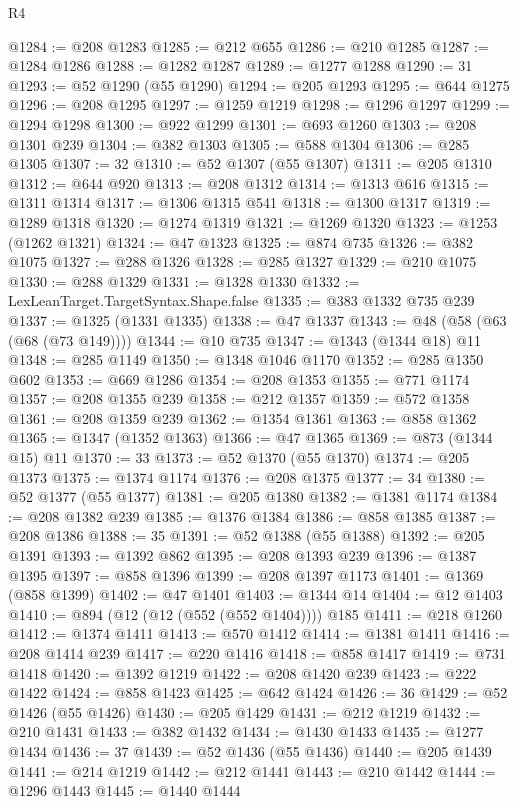 \begin{lexlean}{R4}
\begin{coremodule}
@1284 := @208 @1283
@1285 := @212 @655
@1286 := @210 @1285
@1287 := @1284 @1286
@1288 := @1282 @1287
@1289 := @1277 @1288
@1290 := 31
@1293 := @52 @1290 (@55 @1290)
@1294 := @205 @1293
@1295 := @644 @1275
@1296 := @208 @1295
@1297 := @1259 @1219
@1298 := @1296 @1297
@1299 := @1294 @1298
@1300 := @922 @1299
@1301 := @693 @1260
@1303 := @208 @1301 @239
@1304 := @382 @1303
@1305 := @588 @1304
@1306 := @285 @1305
@1307 := 32
@1310 := @52 @1307 (@55 @1307)
@1311 := @205 @1310
@1312 := @644 @920
@1313 := @208 @1312
@1314 := @1313 @616
@1315 := @1311 @1314
@1317 := @1306 @1315 @541
@1318 := @1300 @1317
@1319 := @1289 @1318
@1320 := @1274 @1319
@1321 := @1269 @1320
@1323 := @1253 (@1262 @1321)
@1324 := @47 @1323
@1325 := @874 @735
@1326 := @382 @1075
@1327 := @288 @1326
@1328 := @285 @1327
@1329 := @210 @1075
@1330 := @288 @1329
@1331 := @1328 @1330
@1332 := LexLeanTarget.TargetSyntax.Shape.false
@1335 := @383 @1332 @735 @239
@1337 := @1325 (@1331 @1335)
@1338 := @47 @1337
@1343 := @48 (@58 (@63 (@68 (@73 @149))))
@1344 := @10 @735
@1347 := @1343 (@1344 @18) @11
@1348 := @285 @1149
@1350 := @1348 @1046 @1170
@1352 := @285 @1350 @602
@1353 := @669 @1286
@1354 := @208 @1353
@1355 := @771 @1174
@1357 := @208 @1355 @239
@1358 := @212 @1357
@1359 := @572 @1358
@1361 := @208 @1359 @239
@1362 := @1354 @1361
@1363 := @858 @1362
@1365 := @1347 (@1352 @1363)
@1366 := @47 @1365
@1369 := @873 (@1344 @15) @11
@1370 := 33
@1373 := @52 @1370 (@55 @1370)
@1374 := @205 @1373
@1375 := @1374 @1174
@1376 := @208 @1375
@1377 := 34
@1380 := @52 @1377 (@55 @1377)
@1381 := @205 @1380
@1382 := @1381 @1174
@1384 := @208 @1382 @239
@1385 := @1376 @1384
@1386 := @858 @1385
@1387 := @208 @1386
@1388 := 35
@1391 := @52 @1388 (@55 @1388)
@1392 := @205 @1391
@1393 := @1392 @862
@1395 := @208 @1393 @239
@1396 := @1387 @1395
@1397 := @858 @1396
@1399 := @208 @1397 @1173
@1401 := @1369 (@858 @1399)
@1402 := @47 @1401
@1403 := @1344 @14
@1404 := @12 @1403
@1410 := @894 (@12 (@12 (@552 (@552 @1404)))) @185
@1411 := @218 @1260
@1412 := @1374 @1411
@1413 := @570 @1412
@1414 := @1381 @1411
@1416 := @208 @1414 @239
@1417 := @220 @1416
@1418 := @858 @1417
@1419 := @731 @1418
@1420 := @1392 @1219
@1422 := @208 @1420 @239
@1423 := @222 @1422
@1424 := @858 @1423
@1425 := @642 @1424
@1426 := 36
@1429 := @52 @1426 (@55 @1426)
@1430 := @205 @1429
@1431 := @212 @1219
@1432 := @210 @1431
@1433 := @382 @1432
@1434 := @1430 @1433
@1435 := @1277 @1434
@1436 := 37
@1439 := @52 @1436 (@55 @1436)
@1440 := @205 @1439
@1441 := @214 @1219
@1442 := @212 @1441
@1443 := @210 @1442
@1444 := @1296 @1443
@1445 := @1440 @1444

\end{coremodule}
\end{lexlean}

